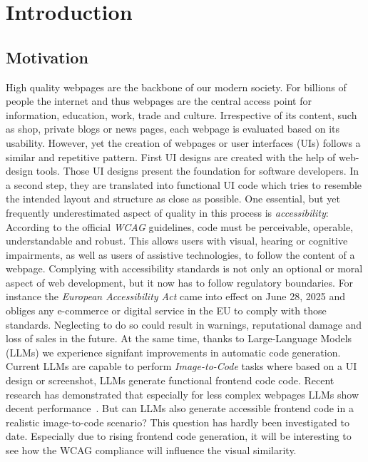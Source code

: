 
\chapter{Introduction}\label{chapter:introduction}

\section{Motivation}
High quality webpages are the backbone of our modern society. 
For billions of people the internet and thus webpages are the central access point 
for information, education, work, trade and culture. Irrespective of 
its content, such as shop, private blogs or news pages, each webpage is 
evaluated based on its usability.
However, yet the creation of webpages or user interfaces (UIs) follows a similar and repetitive 
pattern. First UI designs are created with the help of web-design tools. Those UI designs present 
the foundation for software developers. In a second step, they are translated into 
functional UI code which tries to resemble the intended layout and structure as 
close as possible. \newline
One essential, but yet frequently underestimated aspect of quality in this process is \textit{accessibility}:
According to the official \textit{WCAG} guidelines, code must be perceivable, operable, 
understandable and robust. This allows users with visual, hearing or cognitive
impairments, as well as users of assistive technologies, to follow the content
of a webpage.\newline
Complying with accessibility standards is not only an optional or moral aspect of 
web development, but it now has to follow regulatory boundaries. For instance the 
\textit{European Accessibility Act} came into 
effect on June 28, 2025 and obliges any e-commerce or digital service in the EU 
to comply with those standards. Neglecting to do so could result in warnings,
reputational damage and loss of sales in the future.\newline
At the same time, thanks to Large-Language Models (LLMs) we experience signifant 
improvements in automatic code generation. Current LLMs are capable to perform
\textit{Image-to-Code} tasks where based on a UI design or screenshot,
LLMs generate functional frontend code code. Recent research has demonstrated 
that especially for 
less complex webpages LLMs show decent performance~\parencite{si2024design2code}. \newline
But can LLMs also generate accessible frontend code in a realistic image-to-code scenario? 
This question has hardly been investigated to date. Especially due 
to rising frontend code generation, it will be interesting to see 
how the WCAG compliance will influence the visual similarity.

